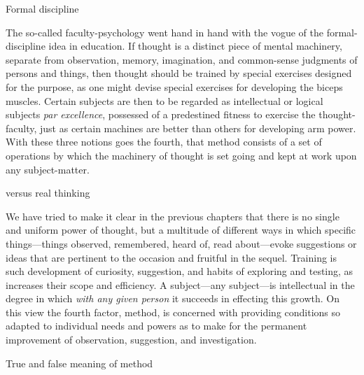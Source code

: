 \documentclass[letterpaper]{book}
\begin{document}
Formal discipline

The so-called faculty-psychology went hand in hand with the vogue of the
formal-discipline idea in education. If thought is a distinct piece of
mental machinery, separate from observation, memory, imagination, and
common-sense judgments of persons and things, then thought should be
trained by special exercises designed for the purpose, as one might
devise special exercises for developing the biceps muscles. Certain
subjects are then to be regarded as intellectual or logical subjects
\emph{par excellence}, possessed of a predestined fitness to exercise
the thought-faculty, just as certain machines are better than others for
developing arm power. With these three notions goes the fourth, that
method consists of a set of operations by which the machinery of thought
is set going and kept at work upon any subject-matter.

versus real thinking

We have tried to make it clear in the previous chapters that there is no
single and uniform power of thought, but a multitude of different ways
in which specific things---things observed, remembered, heard of, read
about---evoke suggestions or ideas that are pertinent to the occasion
and fruitful in the sequel. Training is such development of curiosity,
suggestion, and habits of exploring and testing, as increases their
scope
and efficiency. A subject---any subject---is intellectual in the degree
in which \emph{with any given person} it succeeds in effecting this
growth. On this view the fourth factor, method, is concerned with
providing conditions so adapted to individual needs and powers as to
make for the permanent improvement of observation, suggestion, and
investigation.

True and false meaning of method
\end{document}
